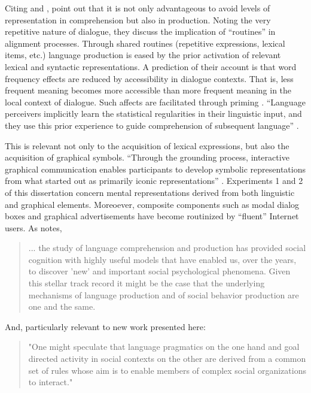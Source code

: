 Citing  \citet{Levelt:1993tk} and \citet{Dell:1986vk}, \citet{Pickering:2003uy}  point out that it is not only advantageous to avoid levels of representation in comprehension but also in production. Noting the very repetitive nature of dialogue, they discuss the implication of ``routines'' in alignment processes. Through shared routines (repetitive expressions, lexical items, etc.) language production is eased by the prior activation of relevant lexical and syntactic representations. A prediction of their account is that word frequency effects are reduced by accessibility in dialogue contexts. That is, less frequent meaning becomes more accessible than more frequent meaning in the local context of dialogue. Such affects are facilitated through priming  \citep{Bargh:2006bo}.  ``Language perceivers implicitly learn the statistical regularities in their linguistic input, and they use this prior experience to guide comprehension of subsequent language''  \citep{MacDonald:2013bx}. 

This is relevant not only to the acquisition of lexical expressions, but also the acquisition of graphical symbols. ``Through the grounding process, interactive graphical communication enables participants to develop symbolic representations from what started out as primarily iconic representations''  \citep[p. 4]{Garrod:2007wk}.  Experiments 1 and 2 of this dissertation concern mental representations derived from both linguistic and graphical elements. Moreoever, composite components such as modal dialog boxes and graphical advertisements have become routinized by ``fluent'' Internet users. As  \citep{Bargh:2006bo}  notes,

\begin{quote}
... the study of language comprehension and production has provided social cognition with highly useful models that have enabled us, over the years, to discover 'new' and important social psychological phenomena. Given this stellar track record it might be the case that the underlying mechanisms of language production and of social behavior production are one and the same. \citep[p. 16]{Bargh:2006bo}
\end{quote}

And, particularly relevant to new work presented here:
\begin{quote}
"One might speculate that language pragmatics on the one hand and goal directed activity in social contexts on the other are derived from a common set of rules whose aim is to enable members of complex social organizations to interact." \citep[p. 105]{Girotto:1990va}
\end{quote}


